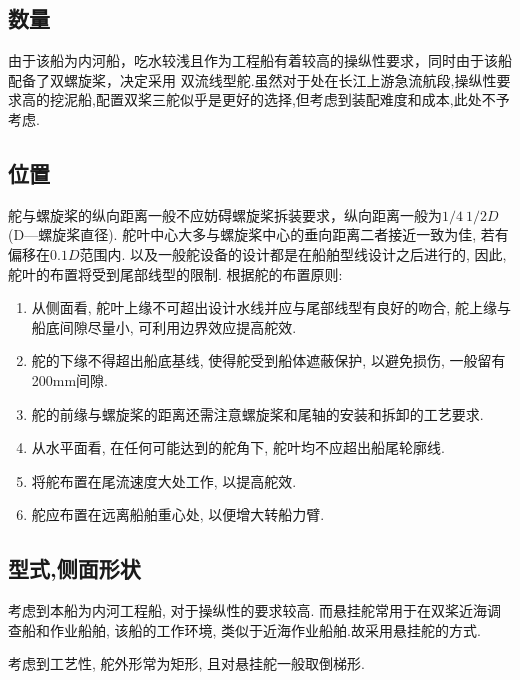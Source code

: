 \documentclass[a4paper,UTF8]{article}
\begin{document}
\subsection{数量}
由于该船为内河船，吃水较浅且作为工程船有着较高的操纵性要求，同时由于该船配备了双螺旋桨，决定采用%
双流线型舵.虽然对于处在长江上游急流航段,操纵性要求高的挖泥船,配置双桨三舵似乎是更好的选择,但考虑到装配难度和成本,此处不予考虑.
\subsection{位置}
舵与螺旋桨的纵向距离一般不应妨碍螺旋桨拆装要求，纵向距离一般为$1/4~1/2D$(D—螺旋桨直径). 舵叶中心大多与螺旋桨中心的垂向距离二者接近一致为佳, 若有偏移在$0.1D$范围内. 以及一般舵设备的设计都是在船舶型线设计之后进行的, 因此, 舵叶的布置将受到尾部线型的限制. 根据舵的布置原则:
\begin{enumerate}
	\item 从侧面看, 舵叶上缘不可超出设计水线并应与尾部线型有良好的吻合, 舵上缘与船底间隙尽量小, 可利用边界效应提高舵效.
	\item 舵的下缘不得超出船底基线, 使得舵受到船体遮蔽保护, 以避免损伤, 一般留有200mm间隙.
	\item 舵的前缘与螺旋桨的距离还需注意螺旋桨和尾轴的安装和拆卸的工艺要求.
	\item 从水平面看, 在任何可能达到的舵角下, 舵叶均不应超出船尾轮廓线.
	\item 将舵布置在尾流速度大处工作, 以提高舵效.
	\item 舵应布置在远离船舶重心处, 以便增大转船力臂.
\end{enumerate}

\subsection{型式,侧面形状}
考虑到本船为内河工程船, 对于操纵性的要求较高. 而悬挂舵常用于在双桨近海调查船和作业船舶, 该船的工作环境, 类似于近海作业船舶.故采用悬挂舵的方式. 

考虑到工艺性, 舵外形常为矩形, 且对悬挂舵一般取倒梯形.
\end{document}
